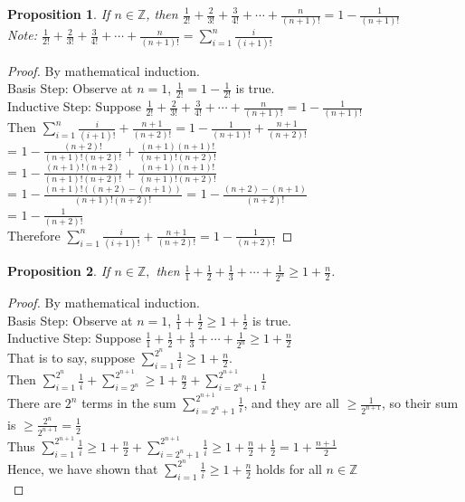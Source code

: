 \documentclass{article}
\newtheorem*{theorem}{Proposition}
\begin{document}
\begin{theorem}
    If \(n \in \mathbb{Z}\), then \(\frac{1}{2!} + \frac{2}{3!} + \frac{3}{4!} + \cdots + \frac{n}{(n+1)!} = 1 - \frac{1}{(n + 1)!}\) \\
    Note: \(\frac{1}{2!} + \frac{2}{3!} + \frac{3}{4!} + \cdots + \frac{n}{(n+1)!} = \sum_{i=1}^{n}{\frac{i}{(i+1)!}}\)
\end{theorem}
\begin{proof}
    By mathematical induction. \\
    Basis Step: Observe at \(n = 1\), \(\frac{1}{2!} = 1 - \frac{1}{2!}\) is true. \\
    Inductive Step: Suppose \(\frac{1}{2!} + \frac{2}{3!} + \frac{3}{4!} + \cdots + \frac{n}{(n+1)!} = 1 - \frac{1}{(n + 1)!}\) \\
    Then \(\sum_{i=1}^{n}{\frac{i}{(i+1)!}} + \frac{n+1}{(n+2)!} = 1-\frac{1}{(n+1)!} + \frac{n+1}{(n+2)!}\) \\
    = \(1 - \frac{(n+2)!}{(n+1)!(n+2)!} + \frac{(n+1)(n+1)!}{(n+1)!(n+2)!}\) \\
    = \(1 - \frac{(n+1)!(n+2)}{(n+1)!(n+2)!} + \frac{(n+1)(n+1)!}{(n+1)!(n+2)!}\) \\
    = \(1 - \frac{(n+1)!((n+2)-(n+1))}{(n+1)!(n+2)!}\) = \(1 - \frac{(n+2)-(n+1)}{(n+2)!}\) \\
    = \(1 - \frac{1}{(n+2)!}\) \\
    Therefore \(\sum_{i=1}^{n}{\frac{i}{(i+1)!}} + \frac{n+1}{(n+2)!} = 1 - \frac{1}{(n+2)!}\)
\end{proof}    

\begin{theorem}
    If \(n \in \mathbb{Z}, \) then \(\frac{1}{1} + \frac{1}{2} + \frac{1}{3} + \cdots + \frac{1}{2^n} \geq 1 + \frac{n}{2}\).
\end{theorem}
\begin{proof}
    By mathematical induction. \\
    Basis Step: Observe at \(n = 1\), \(\frac{1}{1} + \frac{1}{2} \geq 1 + \frac{1}{2}\) is true. \\
    Inductive Step: Suppose \(\frac{1}{1} + \frac{1}{2} + \frac{1}{3} + \cdots + \frac{1}{2^n} \geq 1 + \frac{n}{2}\) \\
    That is to say, suppose \(\sum_{i=1}^{2^n}{\frac{1}{i}} \geq 1 + \frac{n}{2}\). \\
    Then \(\sum_{i=1}^{2^n}{\frac{1}{i}} + \sum_{i=2^n}^{2^{n+1}} \geq 1 + \frac{n}{2} + \sum_{i=2^n+1}^{2^{n+1}}{\frac{1}{i}}\) \\
    There are \(2^n\) terms in the sum \(\sum_{i=2^n+1}^{2^{n+1}}{\frac{1}{i}}\), and they are all \(\geq \frac{1}{2^{n+1}}\), so their sum is \(\geq \frac{2^n}{2^{n+1}} = \frac{1}{2}\) \\
    Thus \(\sum_{i=1}^{2^{n+1}}{\frac{1}{i}} \geq 1 + \frac{n}{2} + \sum_{i=2^n+1}^{2^{n+1}}{\frac{1}{i}} \geq 1 + \frac{n}{2} + \frac{1}{2} = 1 + \frac{n+1}{2}\) \\
    Hence, we have shown that \(\sum_{i=1}^{2^n}{\frac{1}{i}} \geq 1 + \frac{n}{2}\) holds for all \(n \in \mathbb{Z}\) \\
\end{proof}
\end{document}
